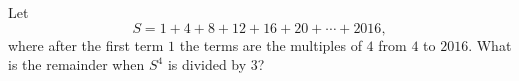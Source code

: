 Let
\[
S=1+4+8+12+16+20+\cdots+2016,
\]
where after the first term $1$ the terms are the multiples of $4$ from $4$ to $2016$. What is the remainder when $S^4$ is divided by $3$?
